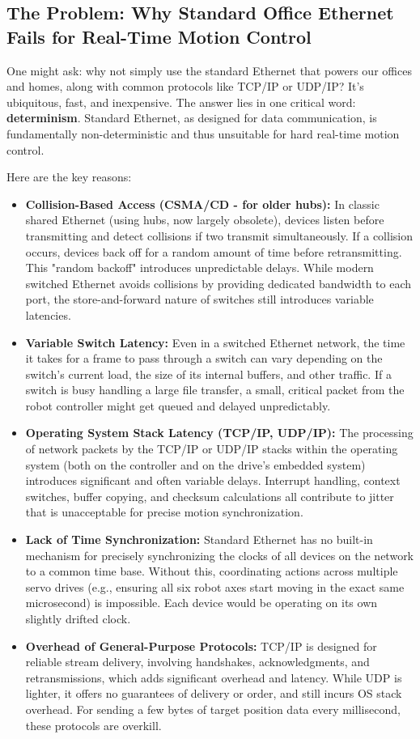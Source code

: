 \subsection{The Problem: Why Standard Office Ethernet Fails for Real-Time Motion Control}
\label{subsec:ethernet_fails_rt}

One might ask: why not simply use the standard Ethernet that powers our offices and homes, along with common protocols like TCP/IP or UDP/IP? It's ubiquitous, fast, and inexpensive. The answer lies in one critical word: \textbf{determinism}. Standard Ethernet, as designed for data communication, is fundamentally non-deterministic and thus unsuitable for hard real-time motion control.

Here are the key reasons:
\begin{itemize}
    \item \textbf{Collision-Based Access (CSMA/CD - for older hubs):} In classic shared Ethernet (using hubs, now largely obsolete), devices listen before transmitting and detect collisions if two transmit simultaneously. If a collision occurs, devices back off for a random amount of time before retransmitting. This "random backoff" introduces unpredictable delays. While modern switched Ethernet avoids collisions by providing dedicated bandwidth to each port, the store-and-forward nature of switches still introduces variable latencies.
    \item \textbf{Variable Switch Latency:} Even in a switched Ethernet network, the time it takes for a frame to pass through a switch can vary depending on the switch's current load, the size of its internal buffers, and other traffic. If a switch is busy handling a large file transfer, a small, critical packet from the robot controller might get queued and delayed unpredictably.
    \item \textbf{Operating System Stack Latency (TCP/IP, UDP/IP):} The processing of network packets by the TCP/IP or UDP/IP stacks within the operating system (both on the controller and on the drive's embedded system) introduces significant and often variable delays. Interrupt handling, context switches, buffer copying, and checksum calculations all contribute to jitter that is unacceptable for precise motion synchronization.
    \item \textbf{Lack of Time Synchronization:} Standard Ethernet has no built-in mechanism for precisely synchronizing the clocks of all devices on the network to a common time base. Without this, coordinating actions across multiple servo drives (e.g., ensuring all six robot axes start moving in the exact same microsecond) is impossible. Each device would be operating on its own slightly drifted clock.
    \item \textbf{Overhead of General-Purpose Protocols:} TCP/IP is designed for reliable stream delivery, involving handshakes, acknowledgments, and retransmissions, which adds significant overhead and latency. While UDP is lighter, it offers no guarantees of delivery or order, and still incurs OS stack overhead. For sending a few bytes of target position data every millisecond, these protocols are overkill.
\end{itemize}
